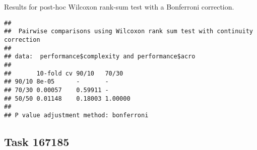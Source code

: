 \documentclass[
]{book}
\newenvironment{Shaded}{\begin{snugshade}}{\end{snugshade}}
\newcommand{\AttributeTok}[1]{\textcolor[rgb]{0.13,0.29,0.53}{#1}}
\newcommand{\ConstantTok}[1]{\textcolor[rgb]{0.56,0.35,0.01}{#1}}
\newcommand{\FunctionTok}[1]{\textcolor[rgb]{0.13,0.29,0.53}{\textbf{#1}}}
\newcommand{\NormalTok}[1]{#1}
\newcommand{\SpecialCharTok}[1]{\textcolor[rgb]{0.81,0.36,0.00}{\textbf{#1}}}
\newcommand{\StringTok}[1]{\textcolor[rgb]{0.31,0.60,0.02}{#1}}
\begin{document}
Results for post-hoc Wilcoxon rank-sum test with a Bonferroni correction.

\begin{Shaded}
\end{Shaded}

\begin{verbatim}
## 
##  Pairwise comparisons using Wilcoxon rank sum test with continuity correction 
## 
## data:  performance$complexity and performance$acro 
## 
##       10-fold cv 90/10   70/30  
## 90/10 8e-05      -       -      
## 70/30 0.00057    0.59911 -      
## 50/50 0.01148    0.18003 1.00000
## 
## P value adjustment method: bonferroni
\end{verbatim}

\hypertarget{task-167185-1}{%
\subsection{Task 167185}\label{task-167185-1}}
\end{document}
